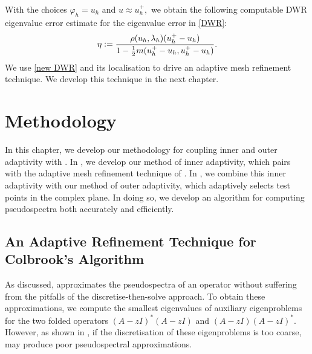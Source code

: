 With the choices $\varphi_h = u_h$ and $u \approx u_h^+,$ we obtain the following computable DWR eigenvalue error estimate for the eigenvalue error in \eqref{DWR}:
\begin{equation} \label{new DWR}
  \eta \vcentcolon= \frac{\rho(u_h, \lambda_h)(u_h^+ - u_h)}{1 - \frac{1}{2} m(u_h^+ - u_h, u_h^+ - u_h)}.
\end{equation}
We use \eqref{new DWR} and its localisation to drive an adaptive mesh refinement technique. We develop this technique in the next chapter. 










\chapter{Methodology}
In this chapter, we develop our methodology for coupling inner and outer adaptivity with .
In , we develop our method of inner adaptivity, which 
pairs  with the adaptive mesh refinement technique of . In , we combine this inner adaptivity with our method of outer adaptivity, which adaptively selects test points in the complex plane. In doing so, we develop an algorithm for computing pseudospectra both accurately and efficiently. 


\section[An Adaptive Refinement Technique for Colbrook's Algorithm]{An Adaptive Refinement Technique for\\Colbrook's Algorithm} \label{Sect31}


As discussed,  approximates the pseudospectra of an operator without suffering from the pitfalls of the discretise-then-solve approach. To obtain these approximations, we compute the smallest eigenvalues of auxiliary eigenproblems for the two folded operators $(A-zI)^*(A-zI)$ and $(A-zI)(A-zI)^*.$ However, as shown in , if the discretisation of these eigenproblems is too coarse,  may produce poor pseudospectral approximations. 



